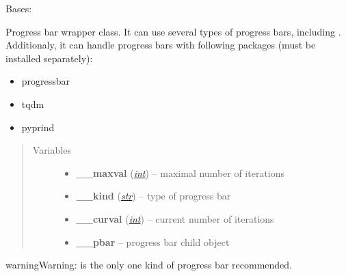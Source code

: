 \documentclass[a4paper,10pt,english]{sphinxmanual}
\begin{document}
\begin{fulllineitems}
\label{aqueduct.utils.log:aqueduct.utils.log.pbar}
Bases: \href{http://docs.python.org/2/library/functions.html\#object}{}

Progress bar wrapper class.
It can use several types of progress bars, including {\hyperref[aqueduct.utils.log:aqueduct.utils.log.SimpleProgressBar]{}}. Additionaly, it can
handle progress bars with following packages (must be installed separately):
\begin{itemize}
\item {} 
progressbar

\item {} 
tqdm

\item {} 
pyprind

\end{itemize}
\begin{quote}\begin{description}
\item[{Variables}] \leavevmode\begin{itemize}
\item {} 
\textbf{\_\_maxval} (\href{http://docs.python.org/2/library/functions.html\#int}{\emph{int}}) -- maximal number of iterations

\item {} 
\textbf{\_\_kind} (\href{http://docs.python.org/2/library/functions.html\#str}{\emph{str}}) -- type of progress bar

\item {} 
\textbf{\_\_curval} (\href{http://docs.python.org/2/library/functions.html\#int}{\emph{int}}) -- current number of iterations

\item {} 
\textbf{\_\_pbar} -- progress bar child object

\end{itemize}

\end{description}\end{quote}

\begin{notice}{warning}{Warning:}
{\hyperref[aqueduct.utils.log:aqueduct.utils.log.SimpleProgressBar]{}} is the only one kind of progress bar recommended.
\end{notice}


\end{fulllineitems}
\end{document}
